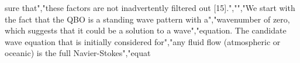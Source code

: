 {{{{{{{sure that","these factors are not inadvertently filtered out {[}15{]}.","","We start with the fact that the QBO is a standing wave pattern with a","wavenumber of zero, which suggests that it could be a solution to a wave","equation. The candidate wave equation that is initially considered for","any fluid flow (atmospheric or oceanic) is the full Navier-Stokes","equat}}}}}}}
